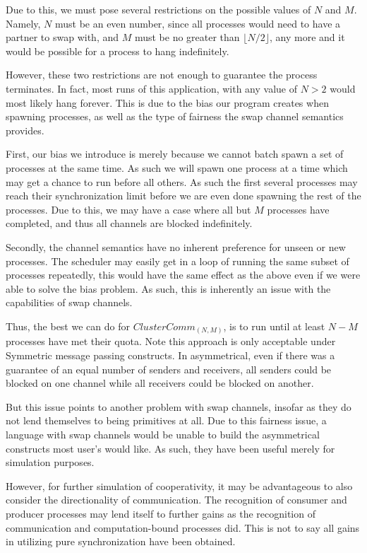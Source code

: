Due to this, we must pose several restrictions on the possible values of $N$ and
$M$. Namely, $N$ must be an even number, since all processes would need to have a 
partner to swap with, and $M$ must be no greater than $\lfloor N/2 \rfloor$, any
more and it would be possible for a process to hang indefinitely.

However, these two restrictions are not enough to guarantee the process terminates.
In fact, most runs of this application, with any value of $N > 2$ would most 
likely hang forever. This is due to the bias our program creates when spawning
processes, as well as the type of fairness the swap channel semantics provides.

First, our bias we introduce is merely because we cannot batch spawn a set of
processes at the same time. As such we will spawn one process at a time which
may get a chance to run before all others. As such the first several processes
may reach their synchronization limit before we are even done spawning the rest
of the processes. Due to this, we may have a case where all but $M$ processes
have completed, and thus all channels are blocked indefinitely.

Secondly, the channel semantics have no inherent preference for unseen 
or new processes. The scheduler may easily get in a loop of running the same
subset of processes repeatedly, this would have the same effect as the above
even if we were able to solve the bias problem. As such, this is inherently an
issue with the capabilities of swap channels. 

Thus, the best we can do for $ClusterComm_{(N,M)}$, is to run until at least 
$N-M$ processes have met their quota. Note this approach is only acceptable 
under Symmetric message passing constructs. In asymmetrical, even if there was
a guarantee of an equal number of senders and receivers, all senders could be
blocked on one channel while all receivers could be blocked on another. 

But this issue points to another problem with swap channels, insofar as they do
not lend themselves to being primitives at all. Due to this fairness issue, a 
language with swap channels would be unable to build the asymmetrical constructs
most user's would like. As such, they have been useful merely for simulation 
purposes.

However, for further simulation of cooperativity, it may be advantageous to also 
consider the directionality of communication. The recognition of consumer and 
producer processes may lend itself to further gains as the recognition of 
communication and computation-bound processes did. This is not to say all gains
in utilizing pure synchronization have been obtained. 
